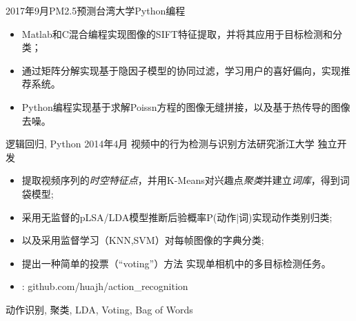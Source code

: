  
\begin{experiences}
			
 \experience
    {2017年9月}{PM2.5预测}{台湾大学}{Python编程}
    {}{
    	\begin{itemize}
    		\item Matlab和C混合编程实现图像的SIFT特征提取，并将其应用于目标检测和分类；
    		\item 通过矩阵分解实现基于隐因子模型的协同过滤，学习用户的喜好偏向，实现推荐系统。
    		\item Python编程实现基于求解Poissn方程的图像无缝拼接，以及基于热传导的图像去噪。
         \end{itemize}
       }
    {逻辑回归, Python}
  \experience
    { 2014年4月} {视频中的行为检测与识别方法研究}{浙江大学}{ 独立开发}
    {}    {
                      \begin{itemize}
                        \item 提取视频序列的\emph{时空特征点}，并用K-Means对兴趣点\emph{聚类}并建立\emph{词库}，得到词袋模型; 
                        \item 采用无监督的pLSA/LDA模型推断后验概率P(动作|词)实现动作类别归类;
                        \item 以及采用监督学习（KNN,SVM）对每帧图像的字典分类;                    
                        \item 提出一种简单的投票（``voting''）方法 实现单相机中的多目标检测任务。
                        \item \faGithub:  {github.com/huajh/action\_recognition}                                                                                          
                      \end{itemize}
                    }
                    {动作识别, 聚类, LDA, Voting, Bag of Words}
	
		
\end{experiences}
